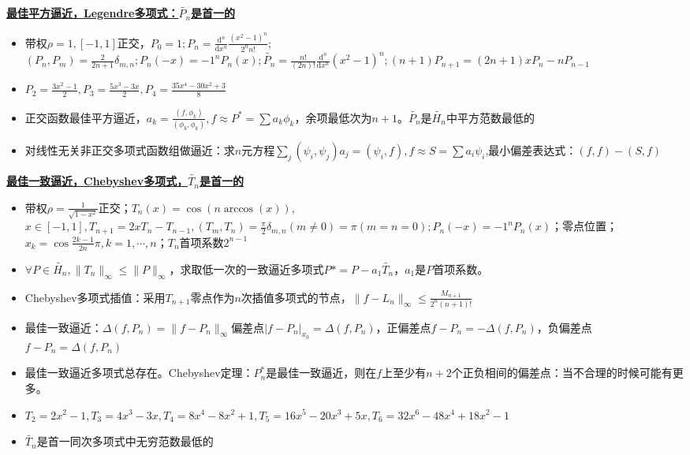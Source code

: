 \documentclass[UTF8,a4paper,landscape,8pt]{paper}
\renewcommand{\subsection}[1]{{\small\textbf{\underline{#1}}}\\ }
\newcommand{\List}[1]{\begin{itemize}[fullwidth,itemindent=0em] #1 \end{itemize}}
\begin{document}
\begin{multicols}{4}
    \subsection{最佳平方逼近，Legendre多项式：$\widetilde {P_n}$是首一的}
    \List{
        \item {带权$\rho = 1,[-1,1]$正交，$P_0=1;P_n=\frac{\mathrm d^n}{\mathrm dx^n} \frac{(x^2-1)^n}{2^nn!};$ \\ $ (P_n,P_m) = \frac{2}{2n+1}\delta_{m,n}; P_n(-x) = -1^nP_n(x); \widetilde {P_n} = \frac{n!}{(2n)!}\frac{\mathrm d^n}{\mathrm dx^n}(x^2-1)^n; (n+1)P_{n+1} = (2n+1)xP_n - nP_{n-1}$}
        \item {$P_2 = \frac{3x^2-1}{2},P_3 = \frac{5x^3-3x}{2},P_4=\frac{35x^4-30x^2+3}{8}$}
        \item {正交函数最佳平方逼近，$a_k=\frac{(f,\phi_k)}{(\phi_k,\phi_k)},f\approx P^* = \sum a_k\phi_k$，余项最低次为$n+1$。$\widetilde {P_n}$是$\widetilde {H_n}$中平方范数最低的}
        \item {对线性无关非正交多项式函数组做逼近：求$n$元方程$\sum_j(\psi_i,\psi_j)a_j = (\psi_i,f), f \approx S = \sum a_i\psi_i$,最小偏差表达式：$(f,f) - (S,f)$}
    }
    \subsection{最佳一致逼近，Chebyshev多项式，$\widetilde{T_n}$是首一的}
    \List{
        \item {带权$\rho = \frac{1}{\sqrt{1-x^2}}$正交；$T_n(x) = \cos(n\arccos(x))$,$x \in[-1,1],T_{n+1} = 2xT_n -T_{n-1},(T_m,T_n) = \frac{\pi}{2}\delta_{m,n}(m \ne 0) = \pi (m = n = 0);P_n(-x) = -1^nP_n(x)$；零点位置；$x_k = \cos\frac{2k-1}{2n}\pi,k = 1,\cdots,n$；$T_n$首项系数$2^{n-1}$}
        \item {$\forall P\in\widetilde{H_n},\|T_n\|_\infty\le \|P\|_\infty$，求取低一次的一致逼近多项式$P* = P - a_1\widetilde{T_n}$，$a_1$是$P$首项系数。}
        \item {Chebyshev多项式插值：采用$T_{n+1}$零点作为$n$次插值多项式的节点，$\|f-L_n\|_\infty \le \frac{M_{n+1}}{2^n(n+1)!}$}
        \item {最佳一致逼近：$\Delta(f,P_n) = \|f-P_n\|_\infty$偏差点$|f-P_n|_{x_0} = \Delta(f,P_n)$，正偏差点$f-P_n = -\Delta(f,P_n)$，负偏差点$f-P_n = \Delta(f,P_n)$}
        \item {最佳一致逼近多项式总存在。Chebyshev定理：$P^*_n$是最佳一致逼近，则在$f$上至少有$n+2$个正负相间的偏差点：当不合理的时候可能有更多。}
        \item {$T_2 = 2x^2-1,T_3 = 4x^3 -3x, T_4 = 8x^4 - 8x^2 + 1,T_5 = 16x^5-20x^3+5x,T_6 = 32x^6-48x^4+18x^2-1$ }
        \item {$\widetilde{T_n}$是首一同次多项式中无穷范数最低的}
    }

\end{multicols}
\end{document}
